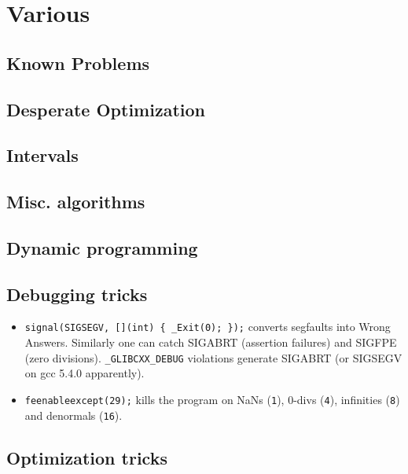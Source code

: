 \chapter{Various}

\section{Known Problems}

\section{Desperate Optimization}

\section{Intervals}

\section{Misc. algorithms}

\section{Dynamic programming}

\section{Debugging tricks}
\begin{itemize}
	\item \texttt{signal(SIGSEGV, [](int) \{ \_Exit(0); \});} converts segfaults into Wrong Answers.
	      Similarly one can catch SIGABRT (assertion failures) and SIGFPE (zero divisions).
	      \texttt{\_GLIBCXX\_DEBUG} violations generate SIGABRT (or SIGSEGV on gcc 5.4.0 apparently).
	\item \texttt{feenableexcept(29);} kills the program on NaNs (\texttt 1), 0-divs (\texttt 4), infinities (\texttt 8) and denormals (\texttt{16}).
\end{itemize}

\section{Optimization tricks}
